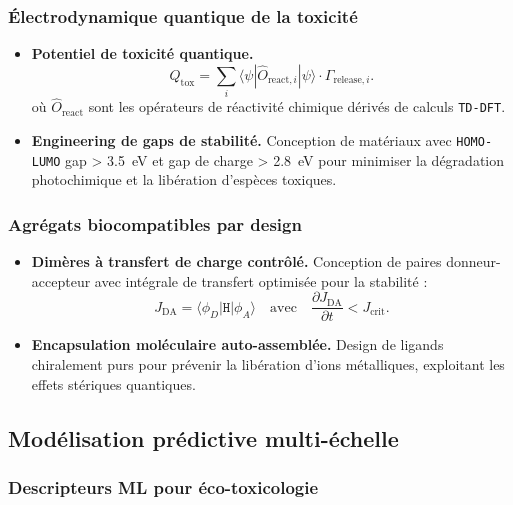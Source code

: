 \documentclass[12pt, a4paper]{article}
\begin{document}
\subsubsection{Électrodynamique quantique de la toxicité}

\begin{itemize}
    \item \textbf{Potentiel de toxicité quantique.}
    \begin{equation}
    Q_{\text{tox}} = \sum_i \langle \psi | \hat{O}_{\text{react},i} | \psi \rangle \cdot \Gamma_{\text{release},i}.
    \end{equation}
    où $\hat{O}_{\text{react}}$ sont les opérateurs de réactivité chimique dérivés de calculs \texttt{TD-DFT}.
    
    \item \textbf{Engineering de gaps de stabilité.} Conception de matériaux avec \texttt{HOMO-LUMO} gap > \SI{3.5}{\electronvolt} et gap de charge > \SI{2.8}{\electronvolt} pour minimiser la dégradation photochimique et la libération d'espèces toxiques.
\end{itemize}

\subsubsection{Agrégats biocompatibles par design}

\begin{itemize}
    \item \textbf{Dimères à transfert de charge contrôlé.} Conception de paires donneur-accepteur avec intégrale de transfert optimisée pour la stabilité :
    \begin{equation}
    J_{\text{DA}} = \langle \phi_D | \mathtt{H} | \phi_A \rangle \quad \text{avec} \quad \frac{\partial J_{\text{DA}}}{\partial t} < J_{\text{crit}}.
    \end{equation}
    
    \item \textbf{Encapsulation moléculaire auto-assemblée.} Design de ligands chiralement purs pour prévenir la libération d'ions métalliques, exploitant les effets stériques quantiques.
\end{itemize}

\subsection{Modélisation prédictive multi-échelle}

\subsubsection{Descripteurs ML pour éco-toxicologie}
\end{document}
